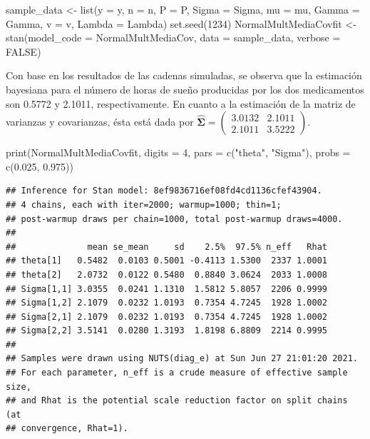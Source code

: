 \documentclass[
  10pt,
  spanish,
]{book}
\newenvironment{Shaded}{\begin{snugshade}}{\end{snugshade}}
\newcommand{\AttributeTok}[1]{\textcolor[rgb]{0.77,0.63,0.00}{#1}}
\newcommand{\ConstantTok}[1]{\textcolor[rgb]{0.00,0.00,0.00}{#1}}
\newcommand{\DecValTok}[1]{\textcolor[rgb]{0.00,0.00,0.81}{#1}}
\newcommand{\FloatTok}[1]{\textcolor[rgb]{0.00,0.00,0.81}{#1}}
\newcommand{\FunctionTok}[1]{\textcolor[rgb]{0.00,0.00,0.00}{#1}}
\newcommand{\NormalTok}[1]{#1}
\newcommand{\OtherTok}[1]{\textcolor[rgb]{0.56,0.35,0.01}{#1}}
\newcommand{\StringTok}[1]{\textcolor[rgb]{0.31,0.60,0.02}{#1}}
\theoremstyle{definition}
\theoremstyle{definition}
\theoremstyle{definition}
\theoremstyle{definition}
\theoremstyle{remark}
\begin{document}
\begin{Shaded}
\begin{Highlighting}[]
\NormalTok{sample\_data }\OtherTok{\textless{}{-}} \FunctionTok{list}\NormalTok{(}\AttributeTok{y =}\NormalTok{ y, }\AttributeTok{n =}\NormalTok{ n, }\AttributeTok{P =}\NormalTok{ P,}
                    \AttributeTok{Sigma =}\NormalTok{ Sigma, }\AttributeTok{mu =}\NormalTok{ mu,}
                    \AttributeTok{Gamma =}\NormalTok{ Gamma, }\AttributeTok{v =}\NormalTok{ v,}
                    \AttributeTok{Lambda =}\NormalTok{ Lambda)}
\FunctionTok{set.seed}\NormalTok{(}\DecValTok{1234}\NormalTok{)}
\NormalTok{NormalMultMediaCovfit }\OtherTok{\textless{}{-}} \FunctionTok{stan}\NormalTok{(}\AttributeTok{model\_code =}\NormalTok{ NormalMultMediaCov,}
                   \AttributeTok{data =}\NormalTok{ sample\_data, }\AttributeTok{verbose =} \ConstantTok{FALSE}\NormalTok{)}
\end{Highlighting}
\end{Shaded}

Con base en los resultados de las cadenas simuladas, se observa que la estimación bayesiana para el número de horas de sueño producidas por los dos medicamentos son 0.5772 y 2.1011, respectivamente. En cuanto a la estimación de la matriz de varianzas y covarianzas, ésta está dada por \(\hat{\boldsymbol \Sigma}=\begin{pmatrix}3.0132&2.1011\\2.1011&3.5222\end{pmatrix}\).

\begin{Shaded}
\begin{Highlighting}[]
\FunctionTok{print}\NormalTok{(NormalMultMediaCovfit, }\AttributeTok{digits =} \DecValTok{4}\NormalTok{, }
      \AttributeTok{pars =} \FunctionTok{c}\NormalTok{(}\StringTok{"theta"}\NormalTok{, }\StringTok{"Sigma"}\NormalTok{), }\AttributeTok{probs =} \FunctionTok{c}\NormalTok{(}\FloatTok{0.025}\NormalTok{, }\FloatTok{0.975}\NormalTok{))}
\end{Highlighting}
\end{Shaded}

\begin{verbatim}
## Inference for Stan model: 8ef9836716ef08fd4cd1136cfef43904.
## 4 chains, each with iter=2000; warmup=1000; thin=1; 
## post-warmup draws per chain=1000, total post-warmup draws=4000.
## 
##              mean se_mean     sd    2.5%  97.5% n_eff   Rhat
## theta[1]   0.5482  0.0103 0.5001 -0.4113 1.5300  2337 1.0001
## theta[2]   2.0732  0.0122 0.5480  0.8840 3.0624  2033 1.0008
## Sigma[1,1] 3.0355  0.0241 1.1310  1.5812 5.8057  2206 0.9999
## Sigma[1,2] 2.1079  0.0232 1.0193  0.7354 4.7245  1928 1.0002
## Sigma[2,1] 2.1079  0.0232 1.0193  0.7354 4.7245  1928 1.0002
## Sigma[2,2] 3.5141  0.0280 1.3193  1.8198 6.8809  2214 0.9995
## 
## Samples were drawn using NUTS(diag_e) at Sun Jun 27 21:01:20 2021.
## For each parameter, n_eff is a crude measure of effective sample size,
## and Rhat is the potential scale reduction factor on split chains (at 
## convergence, Rhat=1).
\end{verbatim}
\end{document}

